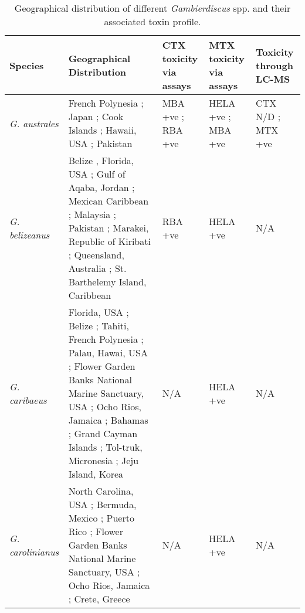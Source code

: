 \documentclass[12pt]{article}
\begin{document}
	
	
	\begin{longtable}{ | p{2cm} | p{5.5cm} | p{2.3cm} | p{2.3cm} | p{2.3cm} | }
	\caption{Geographical distribution of different \emph{Gambierdiscus} spp. and their associated toxin profile.} \\
	\hline
	\textbf{Species} & \textbf{Geographical Distribution} & \textbf{CTX toxicity via assays} & \textbf{MTX toxicity via assays} & \textbf{Toxicity through LC-MS} \\
	\hline
	\emph{G. australes} & French Polynesia \cite{chinain1999morphology}; Japan \cite{nishimura2013genetic}; Cook Islands \cite{rhodes2010toxic}; Hawaii, USA \cite{litaker2009taxonomy}; Pakistan \cite{munir2011occurrence} & MBA +ve \cite{rhodes2010toxic}; RBA +ve \cite{chinain2010growth} & HELA +ve \cite{holland2013differences}; MBA +ve \cite{rhodes2010toxic} & CTX N/D \cite{}; MTX +ve \cite{}\\
	\hline
	\emph{G. belizeanus} & Belize \cite{faust1995observation}, Florida, USA \cite{litaker2009taxonomy}; Gulf of Aqaba, Jordan \cite{saburova2013new}; Mexican Caribbean \cite{hernandez2004species}; Malaysia \cite{leaw2011first}; Pakistan \cite{munir2011occurrence}; Marakei, Republic of Kiribati \cite{xu2014distribution}; Queensland, Australia \cite{}; St. Barthelemy Island, Caribbean \cite{litaker2010global} & RBA +ve \cite{chinain2010growth} & HELA +ve \cite{holland2013differences} & N/A \\ %
	\hline
	\emph{G. caribaeus} & Florida, USA \cite{litaker2009taxonomy}; Belize \cite{litaker2009taxonomy}; Tahiti, French Polynesia \cite{litaker2009taxonomy}; Palau, Hawai, USA \cite{litaker2009taxonomy}; Flower Garden Banks National Marine Sanctuary, USA \cite{holland2013differences}; Ocho Rios, Jamaica \cite{}; Bahamas \cite{litaker2010global}; Grand Cayman Islands \cite{}; Tol-truk, Micronesia \cite{litaker2010global}; Jeju Island, Korea \cite{jeong2012first} & N/A & HELA +ve \cite{holland2013differences} & N/A \\
	\hline
	\emph{G. carolinianus} & North Carolina, USA \cite{litaker2009taxonomy}; Bermuda, Mexico \cite{litaker2010global}; Puerto Rico \cite{holland2013differences}; Flower Garden Banks National Marine Sanctuary, USA \cite{holland2013differences}; Ocho Rios, Jamaica \cite{holland2013differences}; Crete, Greece \cite{holland2013differences} & N/A & HELA +ve \cite{holland2013differences} & N/A\\

\end{longtable}
\end{document}

